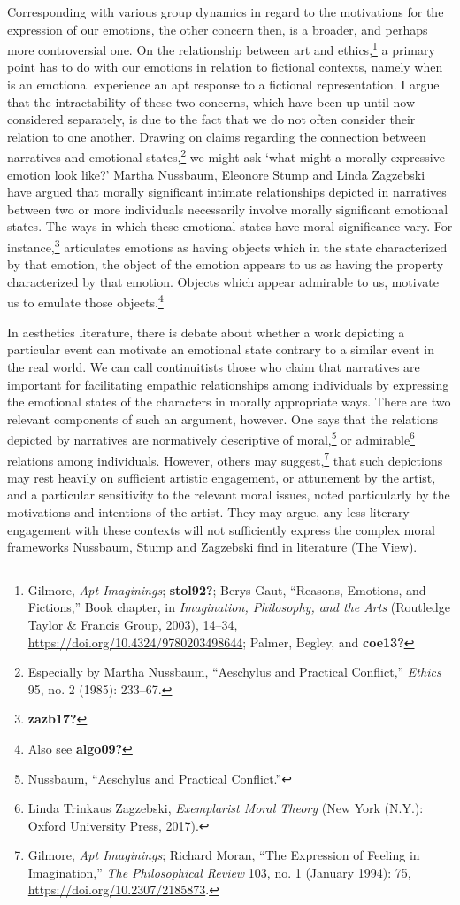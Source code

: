 \documentclass[
  12pt,
]{book}
\theoremstyle{definition}
\theoremstyle{definition}
\theoremstyle{definition}
\theoremstyle{definition}
\theoremstyle{remark}
\begin{document}
Corresponding with various group dynamics in regard to the motivations for the expression of our emotions, the other concern then, is a broader, and perhaps more controversial one. On the relationship between art and ethics,\footnote{Gilmore, \emph{Apt {Imaginings}}; \textbf{stol92?}; Berys Gaut, {``Reasons, Emotions, and Fictions,''} Book chapter, in \emph{Imagination, {Philosophy}, and the {Arts}} (Routledge Taylor \& Francis Group, 2003), 14--34, \url{https://doi.org/10.4324/9780203498644}; Palmer, Begley, and \textbf{coe13?}} a primary point has to do with our emotions in relation to fictional contexts, namely when is an emotional experience an apt response to a fictional representation. I argue that the intractability of these two concerns, which have been up until now considered separately, is due to the fact that we do not often consider their relation to one another. Drawing on claims regarding the connection between narratives and emotional states,\footnote{Especially by Martha Nussbaum, {``Aeschylus and Practical Conflict,''} \emph{Ethics} 95, no. 2 (1985): 233--67.} we might ask `what might a morally expressive emotion look like?' Martha Nussbaum, Eleonore Stump and Linda Zagzebski have argued that morally significant intimate relationships depicted in narratives between two or more individuals necessarily involve morally significant emotional states. The ways in which these emotional states have moral significance vary. For instance,\footnote{\textbf{zazb17?}} articulates emotions as having objects which in the state characterized by that emotion, the object of the emotion appears to us as having the property characterized by that emotion. Objects which appear admirable to us, motivate us to emulate those objects.\footnote{Also see \textbf{algo09?}}

In aesthetics literature, there is debate about whether a work depicting a particular event can motivate an emotional state contrary to a similar event in the real world. We can call continuitists those who claim that narratives are important for facilitating empathic relationships among individuals by expressing the emotional states of the characters in morally appropriate ways. There are two relevant components of such an argument, however. One says that the relations depicted by narratives are normatively descriptive of moral,\footnote{Nussbaum, {``Aeschylus and Practical Conflict.''}} or admirable\footnote{Linda Trinkaus Zagzebski, \emph{Exemplarist {Moral Theory}} (New York (N.Y.): Oxford University Press, 2017).} relations among individuals. However, others may suggest,\footnote{Gilmore, \emph{Apt {Imaginings}}; Richard Moran, {``The {Expression} of {Feeling} in {Imagination},''} \emph{The Philosophical Review} 103, no. 1 (January 1994): 75, \url{https://doi.org/10.2307/2185873}.} that such depictions may rest heavily on sufficient artistic engagement, or attunement by the artist, and a particular sensitivity to the relevant moral issues, noted particularly by the motivations and intentions of the artist. They may argue, any less literary engagement with these contexts will not sufficiently express the complex moral frameworks Nussbaum, Stump and Zagzebski find in literature (The View).
\end{document}
